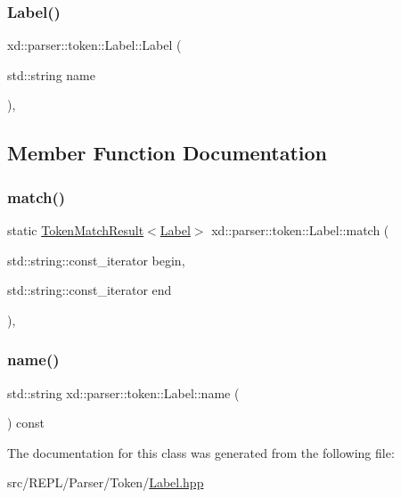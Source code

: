 \subsubsection{\texorpdfstring{Label()}{Label()}}
{\footnotesize\ttfamily xd\+::parser\+::token\+::\+Label\+::\+Label (\begin{DoxyParamCaption}\item[{std\+::string}]{name }\end{DoxyParamCaption})\hspace{0.3cm}{\ttfamily [inline]}, {\ttfamily [explicit]}}



\subsection{Member Function Documentation}
\mbox{\label{classxd_1_1parser_1_1token_1_1_label_abce872395d469652fe1cacc29fab8a2c}} 
\subsubsection{\texorpdfstring{match()}{match()}}
{\footnotesize\ttfamily static \mbox{\hyperlink{namespacexd_1_1parser_1_1token_a766c52bbfb7cb1f08498ef0bb9ec756e}{Token\+Match\+Result}}$<$\mbox{\hyperlink{classxd_1_1parser_1_1token_1_1_label}{Label}}$>$ xd\+::parser\+::token\+::\+Label\+::match (\begin{DoxyParamCaption}\item[{std\+::string\+::const\+\_\+iterator}]{begin,  }\item[{std\+::string\+::const\+\_\+iterator}]{end }\end{DoxyParamCaption})\hspace{0.3cm}{\ttfamily [inline]}, {\ttfamily [static]}}

\mbox{\label{classxd_1_1parser_1_1token_1_1_label_a3c34d9b8e6e7a2e522239b961c5342d9}} 
\subsubsection{\texorpdfstring{name()}{name()}}
{\footnotesize\ttfamily std\+::string xd\+::parser\+::token\+::\+Label\+::name (\begin{DoxyParamCaption}{ }\end{DoxyParamCaption}) const\hspace{0.3cm}{\ttfamily [inline]}}



The documentation for this class was generated from the following file\+:\begin{DoxyCompactItemize}
\item 
src/\+R\+E\+P\+L/\+Parser/\+Token/\mbox{\hyperlink{_label_8hpp}{Label.\+hpp}}\end{DoxyCompactItemize}
